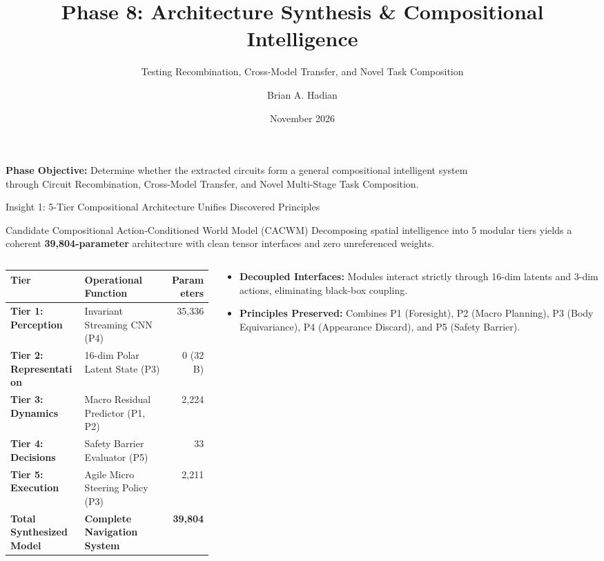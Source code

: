\documentclass[aspectratio=169, 10pt]{beamer}
\title[Phase 8: Architecture Synthesis]{Phase 8: Architecture Synthesis \& Compositional Intelligence}
\subtitle{Testing Recombination, Cross-Model Transfer, and Novel Task Composition}
\author[Brian A. Hadian]{Brian A. Hadian}
\institute[Advanced Agentic Systems]{Action-Conditioned World Models \& Language Navigation on AMD Kria KR260 FPGA}
\date{November 2026}
\begin{document}
\begin{frame}
  \titlepage
  \begin{center}
    \footnotesize
    \textbf{Phase Objective:} Determine whether the extracted circuits form a general compositional intelligent system\\
    through Circuit Recombination, Cross-Model Transfer, and Novel Multi-Stage Task Composition.
  \end{center}
\end{frame}

\begin{frame}{Insight 1: 5-Tier Compositional Architecture Unifies Discovered Principles}
  \begin{block}{Candidate Compositional Action-Conditioned World Model (CACWM)}
    Decomposing spatial intelligence into 5 modular tiers yields a coherent \textbf{39,804-parameter} architecture with clean tensor interfaces and zero unreferenced weights.
  \end{block}
  \vspace{-0.2cm}
  \begin{columns}[T]
    \begin{column}{0.50\textwidth}
      \setlength{\tabcolsep}{3pt}
      \begin{table}
        \centering
        \scriptsize
        \begin{tabular}{llr}
          \toprule
          \textbf{Tier} & \textbf{Operational Function} & \textbf{Parameters} \\
          \midrule
          \textbf{Tier 1: Perception} & Invariant Streaming CNN (P4) & 35,336 \\
          \textbf{Tier 2: Representation} & 16-dim Polar Latent State (P3) & 0 (32 B) \\
          \textbf{Tier 3: Dynamics} & Macro Residual Predictor (P1, P2) & 2,224 \\
          \textbf{Tier 4: Decisions} & Safety Barrier Evaluator (P5) & 33 \\
          \textbf{Tier 5: Execution} & Agile Micro Steering Policy (P3) & 2,211 \\
          \midrule
          \textbf{Total Synthesized Model} & \textbf{Complete Navigation System} & \textbf{39,804} \\
          \bottomrule
        \end{tabular}
      \end{table}
    \end{column}
    \begin{column}{0.46\textwidth}
      \begin{itemize}
        \item \textbf{Decoupled Interfaces:} Modules interact strictly through 16-dim latents and 3-dim actions, eliminating black-box coupling.
        \item \textbf{Principles Preserved:} Combines P1 (Foresight), P2 (Macro Planning), P3 (Body Equivariance), P4 (Appearance Discard), and P5 (Safety Barrier).
      \end{itemize}
    \end{column}
  \end{columns}
\end{frame}
\end{document}
